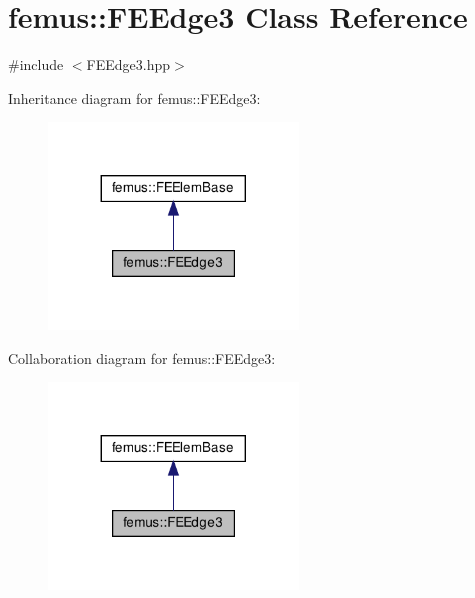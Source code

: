 \hypertarget{classfemus_1_1_f_e_edge3}{}\section{femus\+:\+:F\+E\+Edge3 Class Reference}
\label{classfemus_1_1_f_e_edge3}


{\ttfamily \#include $<$F\+E\+Edge3.\+hpp$>$}



Inheritance diagram for femus\+:\+:F\+E\+Edge3\+:
\nopagebreak
\begin{figure}[H]
\begin{center}
\leavevmode
\includegraphics[width=188pt]{classfemus_1_1_f_e_edge3__inherit__graph}
\end{center}
\end{figure}


Collaboration diagram for femus\+:\+:F\+E\+Edge3\+:
\nopagebreak
\begin{figure}[H]
\begin{center}
\leavevmode
\includegraphics[width=188pt]{classfemus_1_1_f_e_edge3__coll__graph}
\end{center}
\end{figure}
